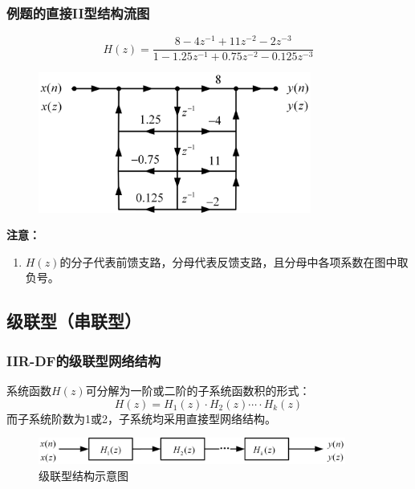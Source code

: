 \documentclass[notheorems,compress,mathserif,table]{beamer}
\begin{document}
\begin{frame}[shrink]\frametitle{例题的直接II型结构流图}%
$$H(z)=\frac{8-4z^{-1}+11z^{-2}-2z^{-3}}{1-1.25z^{-1}+0.75z^{-2}-0.125z^{-3}}$$
\begin{figure}[h]
\centering
\includegraphics[width=0.80\textwidth]{zhijieerxingli.jpg}
\end{figure}
\textbf{注意：}
\begin{enumerate}
  \item  $H(z)$的分子代表前馈支路，分母代表反馈支路，且分母中各项系数在图中取负号。
 \end{enumerate}
\end{frame}
\subsection{级联型（串联型）}
\begin{frame}\frametitle{IIR-DF的级联型网络结构}%
%
系统函数$H(z)$可分解为一阶或二阶的子系统函数积的形式：
$$H(z)=H_1(z)\cdot H_2(z)\cdots \cdot H_k(z)$$
而子系统阶数为1或2，子系统均采用直接型网络结构。
\begin{figure}[h]
\centering
\includegraphics[width=0.9\textwidth]{jilianxing.jpg}
\caption{级联型结构示意图}
\end{figure}
\end{frame}
\end{document}
